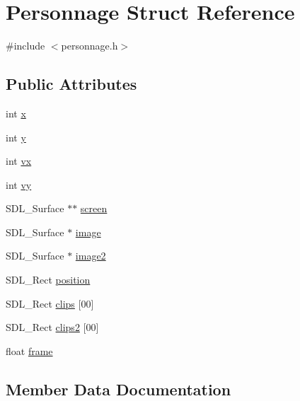 \hypertarget{structPersonnage}{}\section{Personnage Struct Reference}
\label{structPersonnage}


{\ttfamily \#include $<$personnage.\+h$>$}

\subsection*{Public Attributes}
\begin{DoxyCompactItemize}
\item 
int \hyperlink{structPersonnage_aed98af55dd1a3b21c5a446713061b67e}{x}
\item 
int \hyperlink{structPersonnage_a4fdc0728efe8d50059d81a7672c86555}{y}
\item 
int \hyperlink{structPersonnage_ab963d6c6eefa127548925d238119c89d}{vx}
\item 
int \hyperlink{structPersonnage_abe7e4fcd3b7657014b2f00126c506773}{vy}
\item 
S\+D\+L\+\_\+\+Surface $\ast$$\ast$ \hyperlink{structPersonnage_a467b1cc114334f7fb81ae69735d3e550}{screen}
\item 
S\+D\+L\+\_\+\+Surface $\ast$ \hyperlink{structPersonnage_ac93a37ebe619525ecd941dafe6ccff7c}{image}
\item 
S\+D\+L\+\_\+\+Surface $\ast$ \hyperlink{structPersonnage_ad54b53de74e952208e3bf3e174fbe6f4}{image2}
\item 
S\+D\+L\+\_\+\+Rect \hyperlink{structPersonnage_abad4e4ba6f919236ccb16b123a862b63}{position}
\item 
S\+D\+L\+\_\+\+Rect \hyperlink{structPersonnage_ab8784d8fd3ed53b0d45b042f6c7021ca}{clips} \mbox{[}00\mbox{]}
\item 
S\+D\+L\+\_\+\+Rect \hyperlink{structPersonnage_a566f023dd52366a0aac09cc1c9166548}{clips2} \mbox{[}00\mbox{]}
\item 
float \hyperlink{structPersonnage_a6a90db01fde50e7af3ab603ce7e4d78d}{frame}
\end{DoxyCompactItemize}


\subsection{Member Data Documentation}
\mbox{\label{structPersonnage_ab8784d8fd3ed53b0d45b042f6c7021ca}} 
